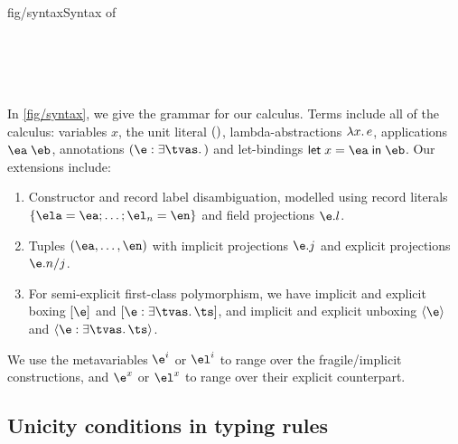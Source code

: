 \documentclass[acmsmall,screen,nonacm,review]{acmart}
\begin{document}
\begin{bnffig}{fig/syntax}{Syntax of \OML}
\\
\\[1ex]
\entry[Types]{\t}{
   \tv \and
   1 \and
   \tya \to \tyb \and
   \T \tys \and
   \Pi \iton \ti \and
   \tpoly \ts
}\\
\\
\\
\end{bnffig}

In \cref {fig/syntax}, we give the grammar for our calculus. Terms include
all of the \ML calculus: variables $x$, the unit literal $()$,
lambda-abstractions $\lambda x. \, e$, applications $\eapp \ea \eb$,
annotations $\eannot \e \tvs \t$ and let-bindings $\elet x \ea \eb$.
Our extensions include:
\begin{enumerate}
\item
  Constructor and record label disambiguation, modelled using record
  literals $\erecord { \ela = \ea; \ldots; \el_n = \en }$ and field
  projections $\efield \e l$.

\item
  Tuples $(\ea, \ldots, \en)$ with implicit projections
  $\efield \e j$ and explicit projections $\exfield \e j n$.

\item
  For semi-explicit first-class polymorphism, we have implicit and explicit boxing $\epoly \e$ and $\expoly \e \tvs \ts$, and implicit and explicit unboxing $\einst \e$ and $\exinst \e \tvs \ts$.

\end{enumerate}
We use the metavariables $\e^i$ or $\el^i$ to range over the fragile/implicit constructions, and $\e^x$ or $\el^x$ to range over their explicit counterpart.


\subsection{Unicity conditions in typing rules}
\end{document}
